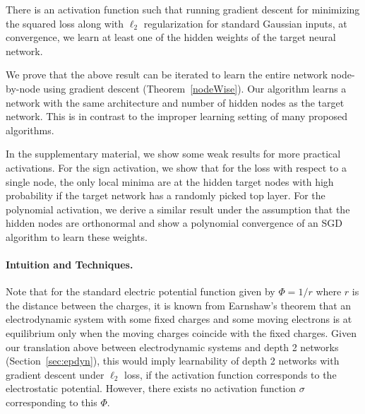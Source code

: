 %
\begin{theorem}
There is an activation function such that running gradient
  descent for minimizing the squared loss along with $\ell_2$
  regularization for standard Gaussian inputs, at convergence, 
  we learn at least one of
  the hidden weights of the target neural network.
\end{theorem}


We  prove that the above result can be iterated to learn the entire network node-by-node using gradient descent (Theorem~\ref{nodeWise}).  Our algorithm learns a network with the same architecture and number of hidden nodes as the target network. This is in contrast to the improper learning setting of many proposed algorithms.

In the supplementary material, we show some weak results for more practical activations. For the sign activation, we show that for the loss with respect to a single node, the only local minima are at the hidden target nodes with high probability if the target network has a randomly picked top layer. For the polynomial activation, we derive a similar result under the assumption that the hidden nodes are orthonormal and show a polynomial convergence of an SGD algorithm to learn these weights.


\paragraph{Intuition and Techniques.}
%
Note that for the standard electric potential function given by $\Phi = 1/r$ where $r$ is the distance between the charges, it is known from Earnshaw's theorem that an electrodynamic system with some fixed charges and some moving electrons is at equilibrium only when the moving charges coincide with the fixed charges. Given our translation above between electrodynamic systems and depth 2 networks (Section~\ref{sec:epdyn}), this would imply learnability of depth 2 networks with gradient descent under $\ell_2$ loss, if the activation function corresponds to the electrostatic potential. However, there exists no activation function $\sigma$ corresponding to this $\Phi$. 
%

